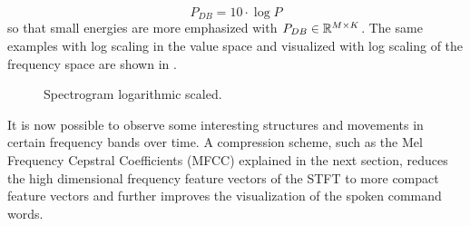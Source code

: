 \begin{equation}\label{eq:signal_spec_log}
  P_{DB} = 10 \cdot \log{P}
\end{equation}
so that small energies are more emphasized with $P_{DB} \in \mathbb{R}^{M \times K}$. 
The same examples with log scaling in the value space and visualized with log scaling of the frequency space are shown in .
\begin{figure}[!ht]
  \centering
  \caption{Spectrogram logarithmic scaled.}
  \label{fig:signal_spec_log_showcase}
\end{figure}
\FloatBarrier
\noindent
It is now possible to observe some interesting structures and movements in certain frequency bands over time.
A compression scheme, such as the Mel Frequency Cepstral Coefficients (MFCC) explained in the next section, reduces the high dimensional frequency feature vectors of the STFT to more compact feature vectors and further improves the visualization of the spoken command words.